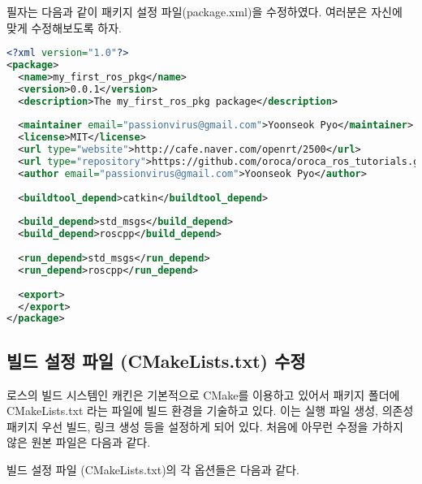 \noindent
필자는 다음과 같이 패키지 설정 파일(package.xml)을 수정하였다. 여러분은 자신에 맞게 수정해보도록 하자.

\begin{lstlisting}[language=XML]
<?xml version="1.0"?>
<package>
  <name>my_first_ros_pkg</name>
  <version>0.0.1</version>
  <description>The my_first_ros_pkg package</description>
 
  <maintainer email="passionvirus@gmail.com">Yoonseok Pyo</maintainer>
  <license>MIT</license>
  <url type="website">http://cafe.naver.com/openrt/2500</url>
  <url type="repository">https://github.com/oroca/oroca_ros_tutorials.git</url>
  <author email="passionvirus@gmail.com">Yoonseok Pyo</author>
 
  <buildtool_depend>catkin</buildtool_depend>
 
  <build_depend>std_msgs</build_depend>
  <build_depend>roscpp</build_depend>
 
  <run_depend>std_msgs</run_depend>
  <run_depend>roscpp</run_depend>
 
  <export>
  </export>
</package>
\end{lstlisting}

\subsection{빌드 설정 파일 (CMakeLists.txt) 수정}

로스의 빌드 시스템인 캐킨은 기본적으로 CMake를 이용하고 있어서 패키지 폴더에 CMakeLists.txt 라는 파일에 빌드 환경을 기술하고 있다. 이는 실행 파일 생성, 의존성 패키지 우선 빌드, 링크 생성 등을 설정하게 되어 있다. 처음에 아무런 수정을 가하지 않은 원본 파일은 다음과 같다.



\noindent
빌드 설정 파일 (CMakeLists.txt)의 각 옵션들은 다음과 같다.

